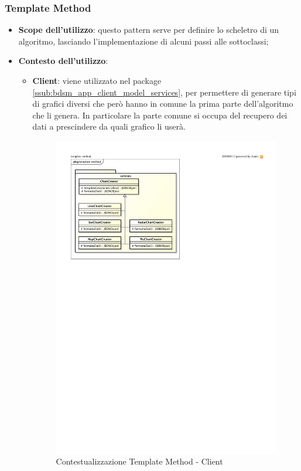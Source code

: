 	\subsubsection{Template Method} %
	\label{ssub:template_method}
		\begin{itemize}
			\item \textbf{Scope dell'utilizzo}: questo pattern serve per definire lo scheletro di un algoritmo, lasciando l'implementazione di alcuni passi alle sottoclassi;
			\item \textbf{Contesto dell'utilizzo}:
				\begin{itemize}
					\item \textbf{Client}: viene utilizzato nel package \ref{ssub:bdsm_app_client_model_services}, per permettere di generare tipi di grafici diversi che però hanno in comune la prima parte dell'algoritmo che li genera. In particolare la parte comune si occupa del recupero dei dati a prescindere da quali grafico li userà.
					\begin{figure}[!htbp]
						\centering
						\centerline{\includegraphics[scale=0.83]{./images/design_pattern_client/client_template_method.pdf}}
						\caption{Contestualizzazione Template Method - Client}
					\end{figure}


\end{itemize}
\end{itemize}
